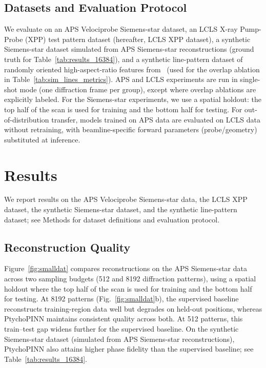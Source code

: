\documentclass{optica-article}
\begin{document}
\subsection{Datasets and Evaluation Protocol}
We evaluate on an APS Velociprobe Siemens-star dataset, an LCLS X-ray Pump-Probe (XPP) test pattern dataset (hereafter, LCLS XPP dataset), a synthetic Siemens-star dataset simulated from APS Siemens-star reconstructions (ground truth for Table~\ref{tab:results_16384}), and a synthetic line-pattern dataset of randomly oriented high-aspect-ratio features from~\cite{Hoidn2023PtychoPINN} (used for the overlap ablation in Table~\ref{tab:sim_lines_metrics}). APS and LCLS experiments are run in single-shot mode (one diffraction frame per group), except where overlap ablations are explicitly labeled. For the Siemens-star experiments, we use a spatial holdout: the top half of the scan is used for training and the bottom half for testing. For out-of-distribution transfer, models trained on APS data are evaluated on LCLS data without retraining, with beamline-specific forward parameters (probe/geometry) substituted at inference.


\section{Results}

We report results on the APS Velociprobe Siemens-star data, the LCLS XPP dataset, the synthetic Siemens-star dataset, and the synthetic line-pattern dataset; see Methods for dataset definitions and evaluation protocol.

\subsection{Reconstruction Quality}

Figure~\ref{fig:smalldat} compares reconstructions on the APS Siemens-star data across two sampling budgets (512 and 8192 diffraction patterns), using a spatial holdout where the top half of the scan is used for training and the bottom half for testing. At 8192 patterns (Fig.~\ref{fig:smalldat}b), the supervised baseline reconstructs training-region data well but degrades on held-out positions, whereas PtychoPINN maintains consistent quality across both. At 512 patterns, this train--test gap widens further for the supervised baseline. On the synthetic Siemens-star dataset (simulated from APS Siemens-star reconstructions), PtychoPINN also attains higher phase fidelity than the supervised baseline; see Table~\ref{tab:results_16384}.
\end{document}
